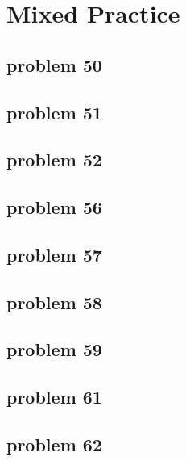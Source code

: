 \section{Mixed Practice}

\subsection{problem 50}


\subsection{problem 51}


\subsection{problem 52}


\subsection{problem 56}


\subsection{problem 57}


\subsection{problem 58}


\subsection{problem 59}


\subsection{problem 61}


\subsection{problem 62}
